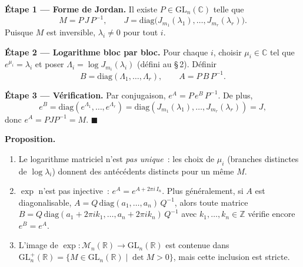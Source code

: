 
\begin{mdframed}[style=proofbar]
  \textbf{Étape 1 — Forme de Jordan.}\enspace
  Il existe $P \in \mathrm{GL}_n(\mathbb{C})$ telle que
  \[
    M = P\,J\,P^{-1}, \qquad
    J = \mathrm{diag}\!\bigl(J_{m_1}(\lambda_1),\ldots,J_{m_r}(\lambda_r)\bigr).
  \]
  Puisque $M$ est inversible, $\lambda_i \neq 0$ pour tout $i$.

  \medskip
  \textbf{Étape 2 — Logarithme bloc par bloc.}\enspace
  Pour chaque $i$, choisir $\mu_i \in \mathbb{C}$ tel que $e^{\mu_i} = \lambda_i$
  et poser $\Lambda_i = \log J_{m_i}(\lambda_i)$ (défini au §\,2). Définir
  \[
    B = \mathrm{diag}(\Lambda_1, \ldots, \Lambda_r), \qquad
    A = P\,B\,P^{-1}.
  \]

  \textbf{Étape 3 — Vérification.}\enspace
  Par conjugaison, $e^A = P\,e^B\,P^{-1}$. De plus,
  \[
    e^B = \mathrm{diag}(e^{\Lambda_1},\ldots,e^{\Lambda_r})
        = \mathrm{diag}(J_{m_1}(\lambda_1),\ldots,J_{m_r}(\lambda_r))
        = J,
  \]
  donc $e^A = PJP^{-1} = M$. \hfill$\blacksquare$
\end{mdframed}

\decsep{}


\begin{tcolorbox}[thmbox]
  \textbf{Proposition.}\enspace
  \begin{enumerate}
    \item Le logarithme matriciel n'est \emph{pas unique}~: les choix de
          $\mu_i$ (branches distinctes de $\log\lambda_i$) donnent
          des antécédents distincts pour un même $M$.
    \item $\exp$ n'est pas injective~: $e^A = e^{A + 2\pi i\,I_n}$.
          Plus généralement, si $A$ est diagonalisable, $A = Q\,\mathrm{diag}(a_1,\dots,a_n)\,Q^{-1}$,
          alors toute matrice $B = Q\,\mathrm{diag}(a_1 + 2\pi i k_1,\dots,a_n + 2\pi i k_n)\,Q^{-1}$
          avec $k_1,\dots,k_n \in \mathbb{Z}$ vérifie encore $e^B = e^A$.
    \item L'image de $\exp : \mathcal{M}_n(\mathbb{R}) \to \mathrm{GL}_n(\mathbb{R})$
          est contenue dans $\mathrm{GL}_n^+(\mathbb{R}) = \{M \in \mathrm{GL}_n(\mathbb{R})
          \mid \det M > 0\}$, mais cette inclusion est stricte.
  \end{enumerate}
\end{tcolorbox}

